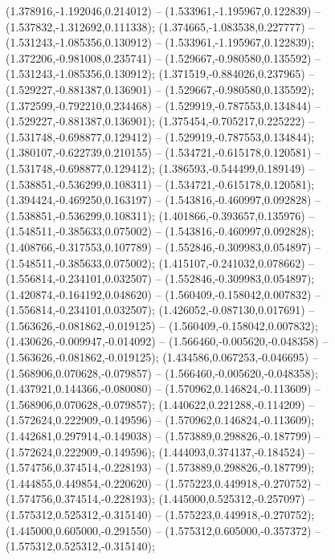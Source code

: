  (1.378916,-1.192046,0.214012) -- (1.533961,-1.195967,0.122839) -- (1.537832,-1.312692,0.111338);
 (1.374665,-1.083538,0.227777) -- (1.531243,-1.085356,0.130912) -- (1.533961,-1.195967,0.122839);
 (1.372206,-0.981008,0.235741) -- (1.529667,-0.980580,0.135592) -- (1.531243,-1.085356,0.130912);
 (1.371519,-0.884026,0.237965) -- (1.529227,-0.881387,0.136901) -- (1.529667,-0.980580,0.135592);
 (1.372599,-0.792210,0.234468) -- (1.529919,-0.787553,0.134844) -- (1.529227,-0.881387,0.136901);
 (1.375454,-0.705217,0.225222) -- (1.531748,-0.698877,0.129412) -- (1.529919,-0.787553,0.134844);
 (1.380107,-0.622739,0.210155) -- (1.534721,-0.615178,0.120581) -- (1.531748,-0.698877,0.129412);
 (1.386593,-0.544499,0.189149) -- (1.538851,-0.536299,0.108311) -- (1.534721,-0.615178,0.120581);
 (1.394424,-0.469250,0.163197) -- (1.543816,-0.460997,0.092828) -- (1.538851,-0.536299,0.108311);
 (1.401866,-0.393657,0.135976) -- (1.548511,-0.385633,0.075002) -- (1.543816,-0.460997,0.092828);
 (1.408766,-0.317553,0.107789) -- (1.552846,-0.309983,0.054897) -- (1.548511,-0.385633,0.075002);
 (1.415107,-0.241032,0.078662) -- (1.556814,-0.234101,0.032507) -- (1.552846,-0.309983,0.054897);
 (1.420874,-0.164192,0.048620) -- (1.560409,-0.158042,0.007832) -- (1.556814,-0.234101,0.032507);
 (1.426052,-0.087130,0.017691) -- (1.563626,-0.081862,-0.019125) -- (1.560409,-0.158042,0.007832);
 (1.430626,-0.009947,-0.014092) -- (1.566460,-0.005620,-0.048358) -- (1.563626,-0.081862,-0.019125);
 (1.434586,0.067253,-0.046695) -- (1.568906,0.070628,-0.079857) -- (1.566460,-0.005620,-0.048358);
 (1.437921,0.144366,-0.080080) -- (1.570962,0.146824,-0.113609) -- (1.568906,0.070628,-0.079857);
 (1.440622,0.221288,-0.114209) -- (1.572624,0.222909,-0.149596) -- (1.570962,0.146824,-0.113609);
 (1.442681,0.297914,-0.149038) -- (1.573889,0.298826,-0.187799) -- (1.572624,0.222909,-0.149596);
 (1.444093,0.374137,-0.184524) -- (1.574756,0.374514,-0.228193) -- (1.573889,0.298826,-0.187799);
 (1.444855,0.449854,-0.220620) -- (1.575223,0.449918,-0.270752) -- (1.574756,0.374514,-0.228193);
 (1.445000,0.525312,-0.257097) -- (1.575312,0.525312,-0.315140) -- (1.575223,0.449918,-0.270752);
 (1.445000,0.605000,-0.291550) -- (1.575312,0.605000,-0.357372) -- (1.575312,0.525312,-0.315140);
